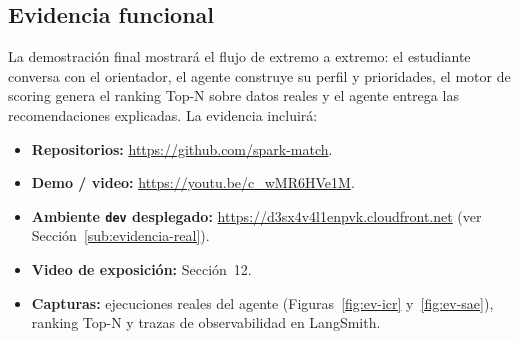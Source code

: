 \subsection{Evidencia funcional}

La demostraci\'on final mostrar\'a el flujo de extremo a extremo: el estudiante
conversa con el orientador, el agente construye su perfil y prioridades, el motor
de scoring genera el ranking Top-N sobre datos reales y el agente entrega las
recomendaciones explicadas. La evidencia incluir\'a:

\begin{itemize}[noitemsep]
  \item \textbf{Repositorios:} \url{https://github.com/spark-match}.
  \item \textbf{Demo / video:} \url{https://youtu.be/c_wMR6HVe1M}.
  \item \textbf{Ambiente \texttt{dev} desplegado:}
        \url{https://d3sx4v4l1enpvk.cloudfront.net} (ver Secci\'on~\ref{sub:evidencia-real}).
  \item \textbf{Video de exposici\'on:} Secci\'on~12.
  \item \textbf{Capturas:} ejecuciones reales del agente
        (Figuras~\ref{fig:ev-icr} y~\ref{fig:ev-sae}), ranking Top-N y trazas de
        observabilidad en LangSmith.
\end{itemize}
